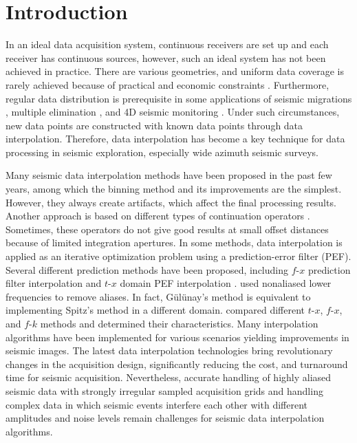 \section{Introduction}
In an ideal data acquisition system, continuous receivers are set up
and each receiver has continuous sources, however, such an ideal
system has not been achieved in practice. There are various
geometries, and uniform data coverage is rarely achieved because of
practical and economic constraints \cite[]{Stone94}. Furthermore,
regular data distribution is prerequisite in some applications of
seismic migrations
\cite[]{Claerbout71,Gardner94,Biondi96,Zhang03}, multiple elimination
\cite[]{Verschuur92,Dragoset98}, and 4D seismic monitoring
\cite[]{Morice00}. Under such circumstances, new data points are
  constructed with known data points through data interpolation.
Therefore, data interpolation has become a key
technique for data processing in seismic
  exploration, especially wide azimuth seismic surveys.

Many seismic data interpolation methods have been proposed in the past
few years, among which the binning method and its improvements are the
simplest. However, they always create artifacts, which affect the
final processing results. Another approach is based on different types
of continuation operators \cite[]{Stolt02,Fomel03,Liu10}.  Sometimes,
these operators do not give good results at small offset distances
because of limited integration apertures. In some methods, data
interpolation is applied as an iterative optimization problem using a
prediction-error filter (PEF). Several different prediction methods
have been proposed, including $f$-$x$ prediction filter interpolation
\cite[]{Spitz91,Porsani99,Wang02,Naghizadeh09} and $t$-$x$ domain PEF 
interpolation
\cite[]{Claerbout91,Fomel02,curry03,Liu11}. \cite{Gulunay03} used
nonaliased lower frequencies to remove aliases. In fact,
G\"{u}l\"{u}nay's method is equivalent to implementing Spitz's method
in a different domain. \cite{Abma03} compared different $t$-$x$,
$f$-$x$, and $f$-$k$ methods and determined their
characteristics. Many interpolation algorithms have been implemented
for various scenarios yielding improvements in seismic images. The
latest data interpolation technologies bring revolutionary changes in
the acquisition design, significantly reducing the cost, and
turnaround time for seismic acquisition. Nevertheless, accurate
handling of highly aliased seismic data with strongly irregular
sampled acquisition grids and handling complex data in which seismic
events interfere each other with different amplitudes and noise levels
remain challenges for seismic data interpolation algorithms.

